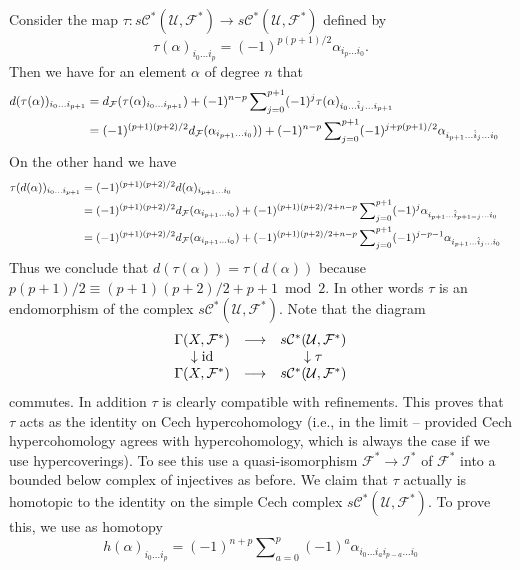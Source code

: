 \medskip\noindent
Consider the map $\tau : s{\mathcal C}^*({\mathcal U},{\mathcal F}^*) \to
s{\mathcal C}^*({\mathcal U},{\mathcal F}^*)$ defined by
$$
\tau(\alpha)_{i_0\ldots i_p} = (-1)^{p(p+1)/2} \alpha_{i_p\ldots i_0}.
$$
Then we have for an element $\alpha$ of degree $n$ that
\begin{align}
d(\tau(\alpha))_{i_0\ldots i_{p+1}}
& =
d_{\mathcal F}(\tau(\alpha)_{i_0\ldots i_{p+1}})
+
(-1)^{n-p}
\sum\nolimits_{j=0}^{p+1}
(-1)^j
\tau(\alpha)_{i_0\ldots \hat i_j\ldots i_{p+1}}
\cr
& =
(-1)^{(p+1)(p+2)/2}
d_{\mathcal F}(\alpha_{i_{p+1}\ldots i_0}))
+
(-1)^{n-p}
\sum\nolimits_{j=0}^{p+1}
(-1)^{j+p(p+1)/2}
\alpha_{i_{p+1}\ldots \hat i_j\ldots i_0}
\end{align}
On the other hand we have
\begin{align}
\tau(d(\alpha))_{i_0\ldots i_{p+1}}
& =
(-1)^{(p+1)(p+2)/2} d(\alpha)_{i_{p+1}\ldots i_0} 
\cr
& =
(-1)^{(p+1)(p+2)/2}
d_{\mathcal F}(\alpha_{i_{p+1}\ldots i_0})
+
(-1)^{(p+1)(p+2)/2+n-p}
\sum\nolimits_{j=0}^{p+1}
(-1)^j
\alpha_{i_{p+1}\ldots \hat i_{p+1-j}\ldots i_0}
\cr
& =
(-1)^{(p+1)(p+2)/2}
d_{\mathcal F}(\alpha_{i_{p+1}\ldots i_0})
+
(-1)^{(p+1)(p+2)/2+n-p}
\sum\nolimits_{j=0}^{p+1}
(-1)^{j-p-1}
\alpha_{i_{p+1}\ldots \hat i_j\ldots i_0}
\end{align}
Thus we conclude that $d(\tau(\alpha))=\tau(d(\alpha))$
because $p(p+1)/2 \equiv (p+1)(p+2)/2+p+1 \bmod 2$. In other words
$\tau$ is an endomorphism of the complex
$s{\mathcal C}^*({\mathcal U},{\mathcal F}^*)$. Note that the diagram
$$
\begin{matrix}
\Gamma(X,{\mathcal F}^*) & \longrightarrow & s{\mathcal C}^*({\mathcal U},{\mathcal F}^*) \cr
\downarrow {\rm id} & & \downarrow \tau \cr
\Gamma(X,{\mathcal F}^*) & \longrightarrow & s{\mathcal C}^*({\mathcal U},{\mathcal F}^*) \cr
\end{matrix}
$$
commutes. In addition $\tau$ is clearly compatible with refinements.
This proves that $\tau$ acts as the identity on Cech hypercohomology
(i.e., in the limit -- provided Cech hypercohomology agrees with
hypercohomology, which is always the case if we use hypercoverings).
To see this use a quasi-isomorphism ${\mathcal F}^* \to {\mathcal I}^*$ of
${\mathcal F}^*$ into a bounded below complex of injectives as before.
We claim that $\tau$ actually is homotopic to the identity on the
simple Cech complex $s{\mathcal C}^*({\mathcal U}, {\mathcal F}^*)$.
To prove this, we use as homotopy
$$
h(\alpha)_{i_0\ldots i_p}
=
(-1)^{n+p}
\sum\nolimits_{a=0}^{p}
(-1)^a
\alpha_{i_0\ldots i_a i_{p-a} \ldots i_0}
$$
